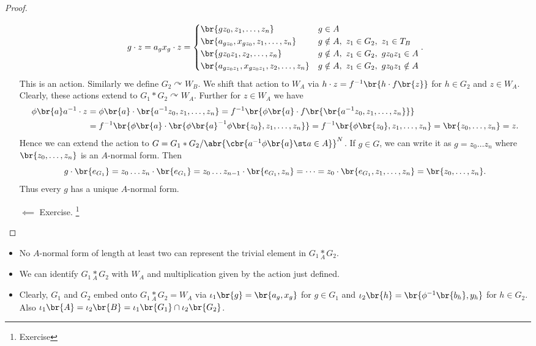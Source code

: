 \begin{proof}
\begin{itemize}
$$ g \cdot z = a_gx_g \cdot z =
\begin{cases}
\br{gz_0, z_1, \dots, z_n} & g \in A \\
\br{a_{gz_0}, x_{gz_0}, z_1, \dots, z_n} & g \notin A, \ z_1 \in G_2, \ z_1 \in T_B \\
\br{gz_0z_1, z_2, \dots, z_n} & g \notin A, \ z_1 \in G_2, \ gz_0z_1 \in A \\
\br{a_{gz_0z_1}, x_{gz_0z_1}, z_2, \dots, z_n} & g \notin A, \ z_1 \in G_2, \ gz_0z_1 \notin A
\end{cases}.
$$
This is an action. Similarly we define $ G_2 \curvearrowright W_B $. We shift that action to $ W_A $ via $ h \cdot z = f^{-1}\br{h \cdot f\br{z}} $ for $ h \in G_2 $ and $ z \in W_A $. Clearly, these actions extend to $ G_1 * G_2 \curvearrowright W_A $. Further for $ z \in W_A $ we have
\begin{align*}
\phi\br{a}a^{-1} \cdot z
& = \phi\br{a} \cdot \br{a^{-1}z_0, z_1, \dots, z_n}
= f^{-1}\br{\phi\br{a} \cdot f\br{\br{a^{-1}z_0, z_1, \dots, z_n}}} \\
& = f^{-1}\br{\phi\br{a} \cdot \br{\phi\br{a}^{-1}\phi\br{z_0}, z_1, \dots, z_n}}
= f^{-1}\br{\phi\br{z_0}, z_1, \dots, z_n}
= \br{z_0, \dots, z_n}
= z.
\end{align*}
Hence we can extend the action to $ G = G_1 * G_2 / \abr{\cbr{a^{-1}\phi\br{a} \st a \in A}}^N $. If $ g \in G $, we can write it as $ g = z_0 \dots z_n $ where $ \br{z_0, \dots, z_n} $ is an $ A $-normal form. Then
$$ g \cdot \br{e_{G_1}} = z_0 \dots z_n \cdot \br{e_{G_1}} = z_0 \dots z_{n - 1} \cdot \br{e_{G_1}, z_n} = \dots = z_0 \cdot \br{e_{G_1}, z_1, \dots, z_n} = \br{z_0, \dots, z_n}. $$
Thus every $ g $ has a unique $ A $-normal form.
\item[$ \impliedby $] Exercise. \footnote{Exercise}
\end{itemize}
\end{proof}

\pagebreak


\begin{corollary}
\hfill
\begin{itemize}
\item No $ A $-normal form of length at least two can represent the trivial element in $ G_1 \underset{A}{*} G_2 $.
\item We can identify $ G_1 \underset{A}{*} G_2 $ with $ W_A $ and multiplication given by the action just defined.
\item Clearly, $ G_1 $ and $ G_2 $ embed onto $ G_1 \underset{A}{*} G_2 = W_A $ via $ \iota_1\br{g} = \br{a_g, x_g} $ for $ g \in G_1 $ and $ \iota_2\br{h} = \br{\phi^{-1}\br{b_h}, y_h} $ for $ h \in G_2 $. Also $ \iota_1\br{A} = \iota_2\br{B} = \iota_1\br{G_1} \cap \iota_2\br{G_2} $.
\end{itemize}
\end{corollary}

